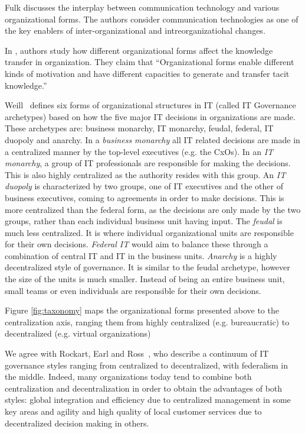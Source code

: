 Fulk \cite{fulk1995} discusses the interplay between communication technology and various organizational forms. The authors consider communication technologies as one of the key enablers of inter-organizational and intreorganizatiohal changes.

In \cite{osterloh2000}, authors study how different organizational forms affect the knowledge transfer in organization. They claim that ``Organizational forms enable different kinds of motivation and have different capacities to generate and transfer tacit knowledge.''

Weill~\cite{Weill2004} defines six forms of organizational structures in IT (called IT Governance archetypes) based on how the five major IT decisions in organizations are made. These archetypes are: business monarchy, IT monarchy, feudal, federal, IT duopoly and anarchy.   In a \textit{business monarchy} all IT related decisions are made in a centralized manner by the top-level executives (e.g. the CxOs). In an \textit{IT monarchy}, a group of IT professionals are responsible for making the decisions. This is also highly centralized as the authority resides with this group. An \textit{IT duopoly} is characterized by two groups, one of IT executives and the other of business executives, coming to agreements in order to make decisions. This is more centralized than the federal form, as the decisions are only made by the two groups, rather than each individual business unit having input. The \textit{feudal} is much less centralized. It is where individual organizational units are responsible for their own decisions. \textit{Federal IT  }would aim to balance these through a combination of central IT and IT in the business units. \textit{Anarchy} is a highly decentralized style of governance. It is similar to the feudal archetype, however the size of the units is much smaller. Instead of being an entire business unit, small teams or even individuals are responsible for their own decisions.

Figure \ref{fig:taxonomy} maps the organizational forms presented above to the centralization axis, ranging them from highly centralized (e.g. bureaucratic) to decentralized (e.g. virtual organizations)

We agree with Rockart, Earl and Ross~\cite{Rockart1996}, who describe a continuum of IT governance styles ranging from centralized to decentralized, with federalism in the middle. Indeed, many organizations today tend to combine both centralization and decentralization in order to obtain the advantages of both styles: global integration and efficiency due to centralized management in some key areas and agility and high quality of local customer services due to decentralized decision making in others. 

